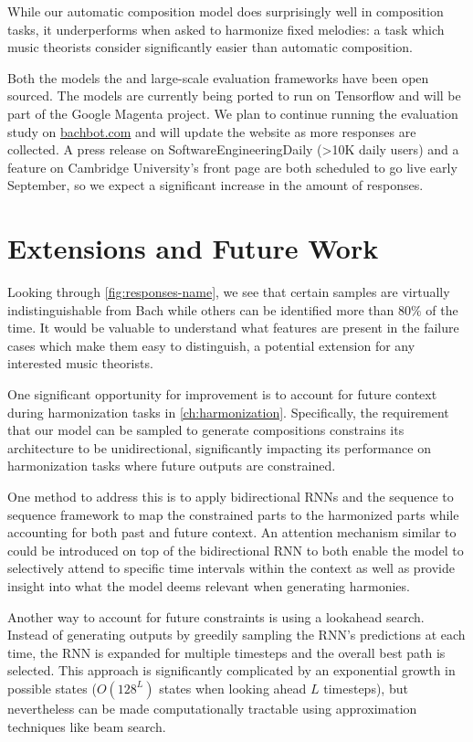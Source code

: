 While our automatic composition model does surprisingly well in composition
tasks, it underperforms when asked to harmonize fixed melodies: a task which
music theorists consider significantly easier than automatic composition.

Both the models the and large-scale evaluation frameworks have been open
sourced. The models are currently being ported to run on Tensorflow and will be
part of the Google Magenta project. We plan to continue running the evaluation
study on \url{bachbot.com} and will update the website as more responses are
collected. A press release on SoftwareEngineeringDaily (>10K daily users) and a
feature on Cambridge University's front page are both scheduled to go live
early September, so we expect a significant increase in the amount of
responses.

\section{Extensions and Future Work}\label{sec:future-work}

Looking through \vref{fig:responses-name}, we see that certain
samples are virtually indistinguishable from Bach while others
can be identified more than $80\%$ of the time. It would be valuable
to understand what features are present in the failure cases which
make them easy to distinguish, a potential extension for any
interested music theorists.

One significant opportunity for improvement is to account for future context
during harmonization tasks in \cref{ch:harmonization}. Specifically, the
requirement that our model can be sampled to generate compositions constrains
its architecture to be unidirectional, significantly impacting its performance
on harmonization tasks where future outputs are constrained.

One method to address this is to apply bidirectional RNNs\citep{Graves2005} and
the sequence to sequence framework\citep{sutskever2014sequence} to map the
constrained parts to the harmonized parts while accounting for both past and
future context. An attention mechanism similar to \citet{Bahdanau2015} could be
introduced on top of the bidirectional RNN to both enable the model to
selectively attend to specific time intervals within the context as well as
provide insight into what the model deems relevant when generating harmonies.


Another way to account for future constraints is using a lookahead
search. Instead of generating outputs by greedily sampling the RNN's
predictions at each time, the RNN is expanded for multiple timesteps and
the overall best path is selected. This approach is significantly
complicated by an exponential growth in possible states ($O(128^L)$
states when looking ahead $L$ timesteps), but nevertheless can be made
computationally tractable using approximation techniques like
beam search\citep{norvig1992paradigms}.

